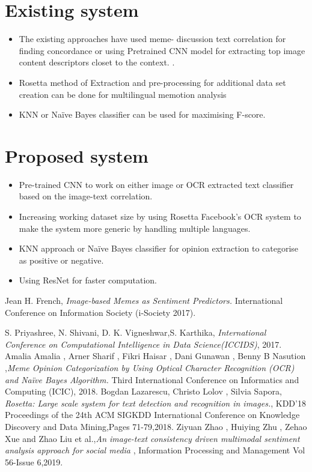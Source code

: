 \documentclass[12pt,a4paper]{article}
\begin{document}
\section{Existing system}
	 \begin{itemize}
	 	\item The existing approaches have used meme- discussion text correlation for finding concordance or using Pretrained CNN model for extracting top image content descriptors closet to the context. \cite{imageSentimentPred}\cite{imageTextConsistency}.
	 	\item Rosetta method of Extraction and pre-processing for additional data set creation can be done for multilingual memotion analysis\cite{rosettaDataset}
	 	\item KNN or Na\"ive Bayes classifier can be used for maximising F-score.\cite{memeOpinionOCR}\cite{memeticEnggTwitter} 	
	 \end{itemize}
 
\section{Proposed system}
  \begin{itemize}
  	\item Pre-trained CNN to work on either image or OCR extracted text classifier based on the image-text correlation.
  	\item Increasing working dataset size by using Rosetta Facebook's OCR system to make the system more generic by handling multiple languages.
  	\item KNN approach or Na\"ive Bayes classifier for opinion extraction to categorise as positive or negative.
  	\item Using ResNet for faster computation.
  \end{itemize}
\newpage
\begin{thebibliography}{99}
	
	
	Jean H. French, {\em Image-based Memes as Sentiment Predictors.
	}International Conference on Information Society (i-Society 2017).
	
	S. Priyashree, N. Shivani, D. K. Vigneshwar,S. Karthika, {\em International Conference on Computational Intelligence in Data Science(ICCIDS)}, 2017.
	Amalia Amalia , Arner Sharif , Fikri Haisar , Dani Gunawan , Benny B Nasution ,{\em Meme Opinion Categorization by Using Optical Character Recognition (OCR) and Na\"ive Bayes Algorithm.} Third International Conference on Informatics and Computing (ICIC), 2018.
	 Bogdan Lazarescu, Christo Lolov , Silvia Sapora, {\em Rosetta: Large scale system for text detection and recognition in images.}, 
	KDD'18 Proceedings of the 24th ACM SIGKDD International Conference on Knowledge Discovery and Data Mining,Pages 71-79,2018.
	Ziyuan Zhao , Huiying Zhu , Zehao Xue and Zhao Liu  et al.,{\em An image-text consistency driven multimodal sentiment analysis approach for social media} , Information Processing and Management Vol 56-Issue 6,2019.
\end{thebibliography}
	
\end{document}
